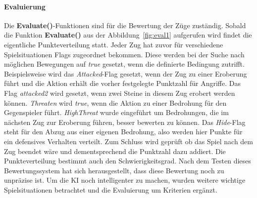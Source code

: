 \paragraph{Evaluierung}
Die \textbf{Evaluate()}-Funktionen sind für die Bewertung der Züge zuständig. Sobald die Funktion \textbf{Evaluate()} aus der Abbildung~\ref{fig:eval1} aufgerufen wird %
 findet die eigentliche Punkteverteilung statt. Jeder Zug hat zuvor für verschiedene Spielsituationen Flags zugeordnet bekommen. Diese werden bei der Suche nach möglichen Bewegungen auf \textit{true} gesetzt, wenn die definierte Bedingung zutrifft. Beispielsweise wird das \textit{Attacked}-Flag gesetzt, wenn der Zug zu einer Eroberung führt und die Aktion erhält die vorher festgelegte Punktzahl für Angriffe. Das Flag \textit{attacked2} wird gesetzt, wenn zwei Steine in diesem Zug erobert werden können. \textit{Threaten} wird \textit{true}, wenn die Aktion zu einer Bedrohung für den Gegenspieler führt. \textit{HighThreat} wurde eingeführt um Bedrohungen, die im nächsten Zug zur Eroberung führen, besser bewerten zu können. Das \textit{Hide}-Flag steht für den Abzug aus einer eigenen Bedrohung, also werden hier Punkte für ein defensives Verhalten verteilt. Zum Schluss wird geprüft ob das Spiel nach dem Zug beendet wäre und dementsprechend die Punktzahl dazu addiert. Die Punkteverteilung bestimmt auch den Schwierigkeitsgrad. Nach dem Testen dieses Bewertungssystem hat sich herausgestellt, dass diese Bewertung noch zu unpräzise ist. Um die KI noch intelligenter zu machen, wurden weitere wichtige Spielsituationen betrachtet und die Evaluierung um Kriterien ergänzt.
